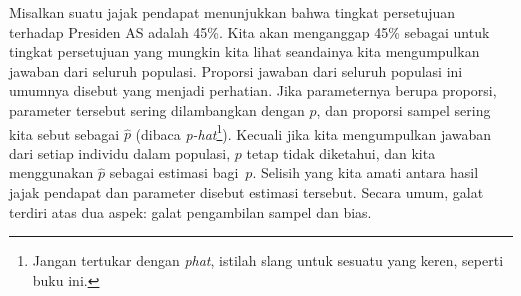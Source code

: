 Misalkan suatu jajak pendapat menunjukkan bahwa tingkat persetujuan
terhadap Presiden AS adalah 45\%.
Kita akan menganggap 45\% sebagai
 untuk tingkat persetujuan
yang mungkin kita lihat seandainya kita mengumpulkan jawaban dari
seluruh populasi.
Proporsi jawaban dari seluruh populasi ini
umumnya disebut 
yang menjadi perhatian.
Jika parameternya berupa proporsi,
parameter tersebut sering dilambangkan dengan $p$,
dan proporsi sampel sering kita sebut sebagai $\hat{p}$
(dibaca \emph{p-hat}\footnote{Jangan tertukar dengan
  \emph{phat}, istilah slang untuk sesuatu yang keren,
  seperti buku ini.}).
Kecuali jika kita mengumpulkan jawaban dari setiap individu dalam populasi,
$p$ tetap tidak diketahui, dan kita menggunakan $\hat{p}$ sebagai estimasi bagi~$p$.
Selisih yang kita amati antara hasil jajak pendapat dan
parameter disebut  estimasi tersebut.
Secara umum, galat terdiri atas dua aspek:
galat pengambilan sampel dan bias.


%
%

